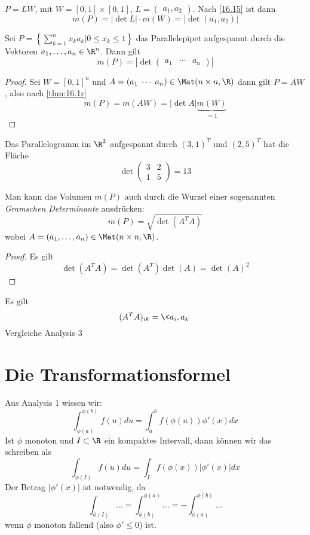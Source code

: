 \documentclass[a4paper,10pt]{scrbook}
\begin{document}
\begin{ex*}
	$P = LW$, mit $W = [0,1] \times [0,1]$, $L = \begin{pmatrix}a_1, a_2\end{pmatrix}$.
	Nach \ref{16.15} ist dann
	\[
		m(P) = |\det L|\cdot m(W) = |\det (a_1,a_2)|
	\]
\end{ex*}

\begin{kor}
	\label{16.16}
	Sei $P = \left\{\sum_{k=1}^n x_k a_k \big| 0\le x_k \le 1\right\}$ das Parallelepipet aufgespannt durch die Vektoren $a_1,\dotsc, a_n\in \R^n$.
	Dann gilt
	\[
		m(P) = \left|\det \begin{pmatrix}a_1 & \cdots & a_n\end{pmatrix}\right|
	\]
	\begin{proof}
		Sei $W = [0,1]^n$ und $A=(a_1 \;\cdots\; a_n) \in \Mat(n\times n,\R)$ dann gilt $P=AW$, also nach \ref{thm:16.1r}
		\[
			m(P) = m(AW) = |\det A| \underbrace{m(W)}_{=1}
		\]
	\end{proof}
\end{kor}

\begin{ex*}
	Das Parallelogramm im $\R^2$ aufgespannt durch $(3,1)^T$ und $(2,5)^T$ hat die Fläche
	\[
		\det \begin{pmatrix}3&2\\1&5\end{pmatrix} = 13
	\]
\end{ex*}

\begin{note}
	Man kann das Volumen $m(P)$ auch durch die Wurzel einer sogenannten \emph{Gramschen Determinante} ausdrücken:
	\[
		m(P) = \sqrt{\det(A^TA)}
	\]
	wobei $A= (a_1, \dotsc, a_n)\in \Mat(n\times n,\R)$.
	\begin{proof}
		Es gilt
		\[
			\det(A^TA) = \det(A^T)\det(A) = \det(A)^2
		\]
	\end{proof}
	Es gilt
	\[
		(A^TA)_{ik} = \<a_i,a_k\>
	\]
	Vergleiche Analysis 3
\end{note}


\section{Die Transformationsformel}


Aus Analysis 1 wissen wir:
\[
	\int_{\phi(a)}^{\phi(b)}f(u) du = \int_a^b f(\phi(u))\phi'(x)dx
\]
Ist $\phi$ monoton und $I\subset \R$ ein kompaktes Intervall, dann können wir das schreiben als
\[
	\int_{\phi(I)}f(u)du = \int_If(\phi(x))|\phi'(x)|dx
\]
Der Betrag $|\phi'(x)|$ ist notwendig, da
\[
	\int_{\phi(I)}\dotso =  \int_{\phi(b)}^{\phi(a)} \dotso = - \int_{\phi(a)}^{\phi(b)}\dotso
\]
wenn $\phi$ monoton fallend (also $\phi' \le 0$) ist.
\end{document}
